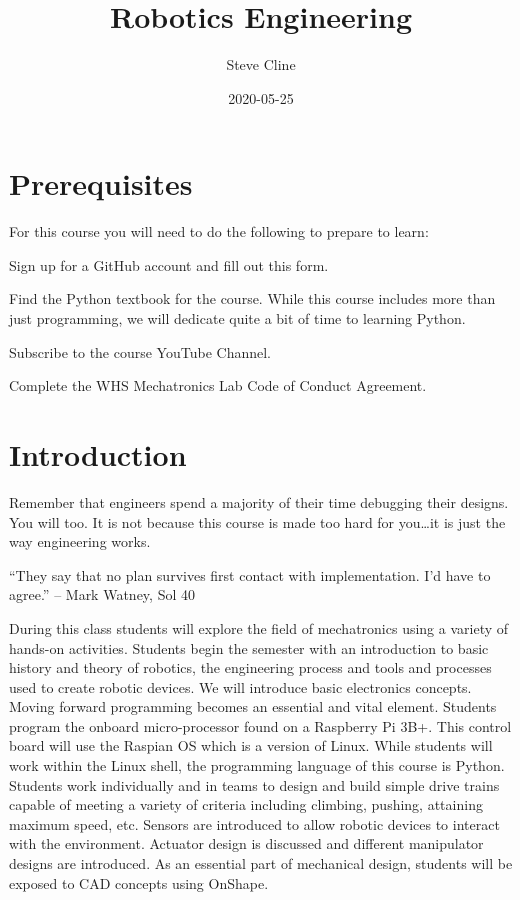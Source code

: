\documentclass[
]{book}
\title{Robotics Engineering}
\author{Steve Cline}
\date{2020-05-25}
\begin{document}
\maketitle

{
\setcounter{tocdepth}{1}
\tableofcontents
}
\hypertarget{prerequisites}{%
\chapter{Prerequisites}\label{prerequisites}}

For this course you will need to do the following to prepare to learn:

Sign up for a GitHub account and fill out this form.

Find the Python textbook for the course. While this course includes more than just programming, we will dedicate quite a bit of time to learning Python.

Subscribe to the course YouTube Channel.

Complete the WHS Mechatronics Lab Code of Conduct Agreement.

\hypertarget{intro}{%
\chapter{Introduction}\label{intro}}

Remember that engineers spend a majority of their time debugging their designs. You will too. It is not because this course is made too hard for you\ldots it is just the way engineering works.

``They say that no plan survives first contact with implementation. I'd have to agree.'' -- Mark Watney, Sol 40

During this class students will explore the field of mechatronics using a variety of hands-on activities. Students begin the semester with an introduction to basic history and theory of robotics, the engineering process and tools and processes used to create robotic devices. We will introduce basic electronics concepts. Moving forward programming becomes an essential and vital element. Students program the onboard micro-processor found on a Raspberry Pi 3B+. This control board will use the Raspian OS which is a version of Linux. While students will work within the Linux shell, the programming language of this course is Python. Students work individually and in teams to design and build simple drive trains capable of meeting a variety of criteria including climbing, pushing, attaining maximum speed, etc. Sensors are introduced to allow robotic devices to interact with the environment. Actuator design is discussed and different manipulator designs are introduced. As an essential part of mechanical design, students will be exposed to CAD concepts using OnShape.
\end{document}
